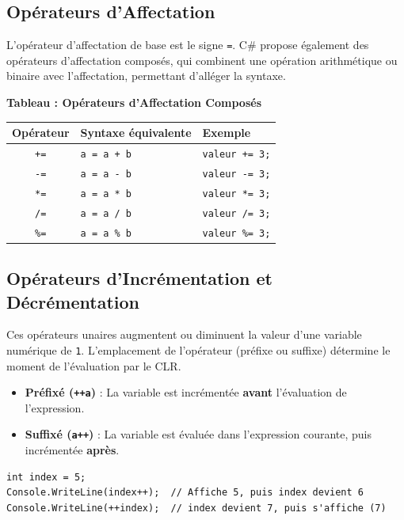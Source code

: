 \subsection{Opérateurs d'Affectation}

L'opérateur d'affectation de base est le signe \texttt{=}. C\# propose également des opérateurs d'affectation composés, qui combinent une opération arithmétique ou binaire avec l'affectation, permettant d'alléger la syntaxe.

\begin{center}
    \textbf{Tableau : Opérateurs d'Affectation Composés} \\[0.3cm]
    \begin{tabular}{@{}cll@{}}
        \toprule
        \textbf{Opérateur} & \textbf{Syntaxe équivalente} & \textbf{Exemple} \\
        \midrule
        \texttt{+=} & \texttt{a = a + b} & \texttt{valeur += 3;} \\
        \texttt{-=} & \texttt{a = a - b} & \texttt{valeur -= 3;} \\
        \texttt{*=} & \texttt{a = a * b} & \texttt{valeur *= 3;} \\
        \texttt{/=} & \texttt{a = a / b} & \texttt{valeur /= 3;} \\
        \texttt{\%=} & \texttt{a = a \% b} & \texttt{valeur \%= 3;} \\
        \bottomrule
    \end{tabular}
\end{center}

\subsection{Opérateurs d'Incrémentation et Décrémentation}

Ces opérateurs unaires augmentent ou diminuent la valeur d'une variable numérique de \texttt{1}. L'emplacement de l'opérateur (préfixe ou suffixe) détermine le moment de l'évaluation par le CLR.

\begin{itemize}
    \item \textbf{Préfixé (\texttt{++a})} : La variable est incrémentée \textbf{avant} l'évaluation de l'expression.
    \item \textbf{Suffixé (\texttt{a++})} : La variable est évaluée dans l'expression courante, puis incrémentée \textbf{après}.
\end{itemize}

\begin{lstlisting}[caption={Incrémentation préfixée et suffixée}]
int index = 5;
Console.WriteLine(index++);  // Affiche 5, puis index devient 6
Console.WriteLine(++index);  // index devient 7, puis s'affiche (7)
\end{lstlisting}

